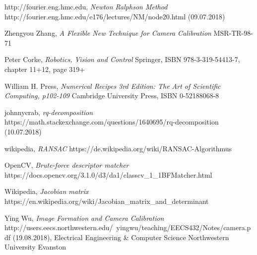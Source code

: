\documentclass[11pt,a4paper,titlepage,oneside]{report}
\begin{document}
\begin{thebibliography}{1}
  http://fourier.eng.hmc.edu,
  \textit{Newton Ralphson Method}
  http://fourier.eng.hmc.edu/e176/lectures/NM/node20.html (09.07.2018)

  Zhengyou Zhang,
  \textit{A Flexible New Technique for Camera Calibration}
  MSR-TR-98-71

	Peter Corke,
	\textit{Robotics, Vision and Control}
	Springer, ISBN 978-3-319-54413-7, chapter 11+12, page 319+

	William H. Press,
	\textit{Numerical Recipes 3rd Edition: The Art of Scientific Computing, p102-109} 
	Cambridge University Press, ISBN 0-52188068-8

	johnnycrab,
	\textit{rq-decomposition} 
	https://math.stackexchange.com/questions/1640695/rq-decomposition (10.07.2018)

	wikipedia,
	\textit{RANSAC}
	https://de.wikipedia.org/wiki/RANSAC-Algorithmus

	OpenCV,
	\textit{Brute-force descriptor matcher}
	https://docs.opencv.org/3.1.0/d3/da1/classcv\_1\_1BFMatcher.html

	Wikipedia,
	\textit{Jacobian matrix}
	https://en.wikipedia.org/wiki/Jacobian\_matrix\_and\_determinant

	Ying Wu,
	\textit{Image Formation and Camera Calibration}
	http://users.eecs.northwestern.edu/~yingwu/teaching/EECS432/Notes/camera.pdf (19.08.2018), Electrical Engineering \& Computer Science Northwestern University Evanston

\end{thebibliography}
\end{document}

